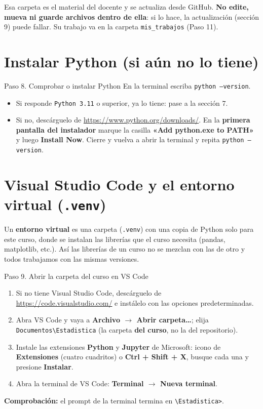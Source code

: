 \documentclass[11pt,a4paper]{article}
\newcommand{\cmd}[1]{\texttt{\textcolor{petroleo}{#1}}}
\begin{document}
\begin{alerta}[title=No trabaje dentro de \texttt{Informacion\_estadistica}]
Esa carpeta es el material del docente y se actualiza desde GitHub. \textbf{No edite, mueva ni guarde archivos dentro de ella}: si lo hace, la actualización (sección 9) puede fallar. Su trabajo va en la carpeta \texttt{mis\_trabajos} (Paso 11).
\end{alerta}

\section{Instalar Python (si aún no lo tiene)}

\begin{paso}{Paso 8. Comprobar o instalar Python}
En la terminal escriba \cmd{python --version}.
\begin{itemize}[leftmargin=*]
  \item Si responde \texttt{Python 3.11} o superior, ya lo tiene: pase a la sección 7.
  \item Si no, descárguelo de \url{https://www.python.org/downloads/}. En la \textbf{primera pantalla del instalador} marque la casilla \textbf{«Add python.exe to PATH»} y luego \textbf{Install Now}. Cierre y vuelva a abrir la terminal y repita \cmd{python --version}.
\end{itemize}
\end{paso}

\section{Visual Studio Code y el entorno virtual (\texttt{.venv})}

Un \textbf{entorno virtual} es una carpeta (\texttt{.venv}) con una copia de Python solo para este curso, donde se instalan las librerías que el curso necesita (pandas, matplotlib, etc.). Así las librerías de un curso no se mezclan con las de otro y todos trabajamos con las mismas versiones.

\begin{paso}{Paso 9. Abrir la carpeta del curso en VS Code}
\begin{enumerate}[leftmargin=*]
  \item Si no tiene Visual Studio Code, descárguelo de \url{https://code.visualstudio.com/} e instálelo con las opciones predeterminadas.
  \item Abra VS Code y vaya a \textbf{Archivo $\rightarrow$ Abrir carpeta\ldots}; elija \texttt{Documentos\textbackslash Estadistica} (la carpeta \textbf{del curso}, no la del repositorio).
  \item Instale las extensiones \textbf{Python} y \textbf{Jupyter} de Microsoft: icono de \textbf{Extensiones} (cuatro cuadritos) o \textbf{Ctrl + Shift + X}, busque cada una y presione \textbf{Instalar}.
  \item Abra la terminal de VS Code: \textbf{Terminal $\rightarrow$ Nueva terminal}.
\end{enumerate}
\textbf{Comprobación:} el prompt de la terminal termina en \texttt{\textbackslash Estadistica>}.
\end{paso}
\end{document}

